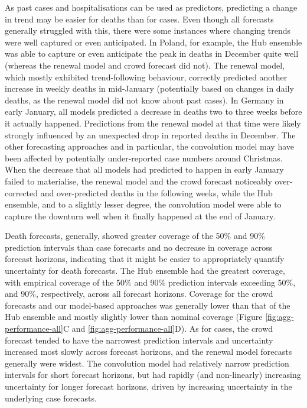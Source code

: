 \documentclass[10pt,letterpaper]{article}
\begin{document}
As past cases and hospitalisations can be used as predictors, predicting
a change in trend may be easier for deaths than for cases. Even though
all forecasts generally struggled with this, there were some instances
where changing trends were well captured or even anticipated. In Poland,
for example, the Hub ensemble was able to capture or even anticipate the
peak in deaths in December quite well (whereas the renewal model and
crowd forecast did not). The renewal model, which mostly exhibited
trend-following behaviour, correctly predicted another increase in
weekly deaths in mid-January (potentially based on changes in daily
deaths, as the renewal model did not know about past cases). In Germany
in early January, all models predicted a decrease in deaths two to three
weeks before it actually happened. Predictions from the renewal model at
that time were likely strongly influenced by an unexpected drop in
reported deaths in December. The other forecasting approaches and in
particular, the convolution model may have been affected by potentially
under-reported case numbers around Christmas. When the decrease that all
models had predicted to happen in early January failed to materialise,
the renewal model and the crowd forecast noticeably over-corrected and
over-predicted deaths in the following weeks, while the Hub ensemble,
and to a slightly lesser degree, the convolution model were able to
capture the downturn well when it finally happened at the end of
January.

Death forecasts, generally, showed greater coverage of the 50\% and 90\%
prediction intervals than case forecasts and no decrease in coverage
across forecast horizons, indicating that it might be easier to
appropriately quantify uncertainty for death forecasts. The Hub ensemble
had the greatest coverage, with empirical coverage of the 50\% and 90\%
prediction intervals exceeding 50\%, and 90\%, respectively, across all
forecast horizons. Coverage for the crowd forecasts and our model-based
approaches was generally lower than that of the Hub ensemble and mostly
slightly lower than nominal coverage (Figure
\ref{fig:agg-performance-all}C and \ref{fig:agg-performance-all}D). As
for cases, the crowd forecast tended to have the narrowest prediction
intervals and uncertainty increased most slowly across forecast
horizons, and the renewal model forecasts generally were widest. The
convolution model had relatively narrow prediction intervals for short
forecast horizons, but had rapidly (and non-linearly) increasing
uncertainty for longer forecast horizons, driven by increasing
uncertainty in the underlying case forecasts.
\end{document}
